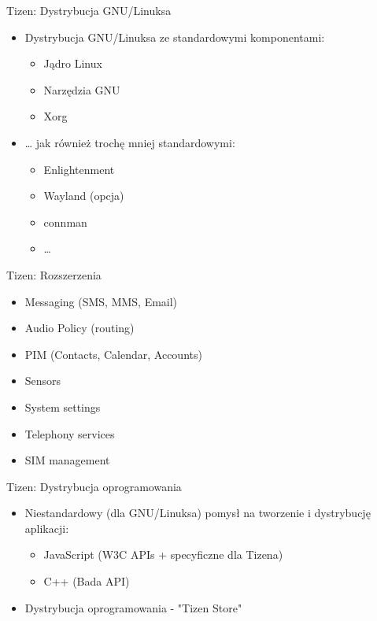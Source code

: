 \documentclass[presentation,aspectratio=43,12pt]{beamer}
\begin{document}
\begin{frame}[label=sec-2-1]{Tizen: Dystrybucja GNU/Linuksa}
\begin{itemize}
\item Dystrybucja GNU/Linuksa ze standardowymi komponentami:
\begin{itemize}
\item Jądro Linux
\item Narzędzia GNU
\item Xorg
\end{itemize}

\item \ldots{} jak również trochę mniej standardowymi:
\begin{itemize}
\item Enlightenment
\item Wayland (opcja)
\item connman
\item \ldots{}
\end{itemize}
\end{itemize}

\end{frame}
\begin{frame}[label=sec-2-2]{Tizen: Rozszerzenia}
\begin{itemize}
\item Messaging (SMS, MMS, Email)
\item Audio Policy (routing)
\item PIM (Contacts, Calendar, Accounts)
\item Sensors
\item System settings
\item Telephony services
\item SIM management
\end{itemize}

\end{frame}

\begin{frame}[label=sec-2-3]{Tizen: Dystrybucja oprogramowania}
\begin{itemize}
\item Niestandardowy (dla GNU/Linuksa) pomysł na tworzenie i dystrybucję
aplikacji:

\begin{itemize}
\item JavaScript (W3C APIs + specyficzne dla Tizena)
\item C++ (Bada API)
\end{itemize}

\item Dystrybucja oprogramowania - "Tizen Store"
\end{itemize}
\end{frame}
\end{document}
